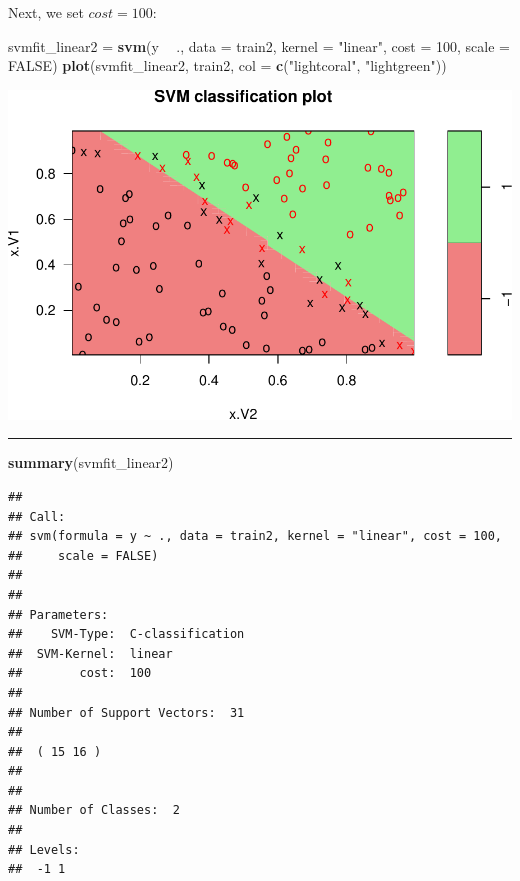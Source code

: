 \documentclass[]{article}
\newenvironment{Shaded}{\begin{snugshade}}{\end{snugshade}}
\newcommand{\DataTypeTok}[1]{\textcolor[rgb]{0.13,0.29,0.53}{#1}}
\newcommand{\DecValTok}[1]{\textcolor[rgb]{0.00,0.00,0.81}{#1}}
\newcommand{\KeywordTok}[1]{\textcolor[rgb]{0.13,0.29,0.53}{\textbf{#1}}}
\newcommand{\NormalTok}[1]{#1}
\newcommand{\OperatorTok}[1]{\textcolor[rgb]{0.81,0.36,0.00}{\textbf{#1}}}
\newcommand{\OtherTok}[1]{\textcolor[rgb]{0.56,0.35,0.01}{#1}}
\newcommand{\StringTok}[1]{\textcolor[rgb]{0.31,0.60,0.02}{#1}}
\begin{document}
Next, we set \(cost=100\): \footnotesize

\begin{Shaded}
\begin{Highlighting}[]
\NormalTok{svmfit_linear2 =}\StringTok{ }\KeywordTok{svm}\NormalTok{(y }\OperatorTok{~}\StringTok{ }\NormalTok{., }\DataTypeTok{data =}\NormalTok{ train2, }\DataTypeTok{kernel =} \StringTok{"linear"}\NormalTok{, }\DataTypeTok{cost =} \DecValTok{100}\NormalTok{, }
    \DataTypeTok{scale =} \OtherTok{FALSE}\NormalTok{)}
\KeywordTok{plot}\NormalTok{(svmfit_linear2, train2, }\DataTypeTok{col =} \KeywordTok{c}\NormalTok{(}\StringTok{"lightcoral"}\NormalTok{, }\StringTok{"lightgreen"}\NormalTok{))}
\end{Highlighting}
\end{Shaded}

\includegraphics{9SVM_files/figure-latex/unnamed-chunk-13-1.pdf}

\begin{center}\rule{0.5\linewidth}{\linethickness}\end{center}

\begin{Shaded}
\begin{Highlighting}[]
\KeywordTok{summary}\NormalTok{(svmfit_linear2)}
\end{Highlighting}
\end{Shaded}

\begin{verbatim}
## 
## Call:
## svm(formula = y ~ ., data = train2, kernel = "linear", cost = 100, 
##     scale = FALSE)
## 
## 
## Parameters:
##    SVM-Type:  C-classification 
##  SVM-Kernel:  linear 
##        cost:  100 
## 
## Number of Support Vectors:  31
## 
##  ( 15 16 )
## 
## 
## Number of Classes:  2 
## 
## Levels: 
##  -1 1
\end{verbatim}
\end{document}
